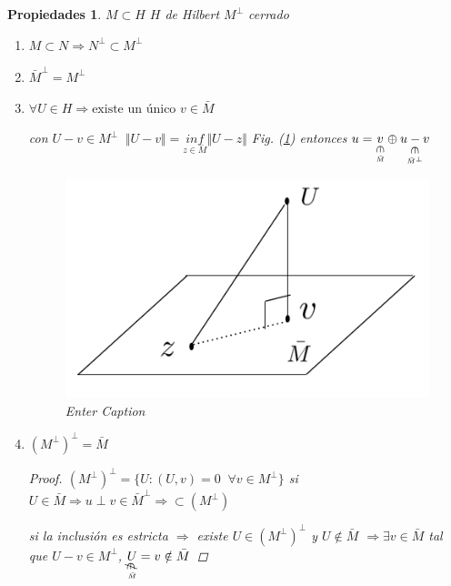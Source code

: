 \documentclass[a4paper,10pt]{book}
\newtheorem{propiedades}{Propiedades}
\newcommand{\rotin}{\mathbin{\rotatebox[origin=c]{270}{$\in$}}}
\newcommand{\rotnotin}{\mathbin{\rotatebox[origin=c]{270}{$\notin$}}}
\begin{document}
\begin{propiedades} $M\subset H$ $H$ de Hilbert  $M^\perp$ cerrado 
\begin{enumerate}
    \item $M\subset N \Rightarrow N^\perp \subset M^\perp$
    \item $\bar{M}^\perp = M^\perp$
    \item $\forall U \in H \Rightarrow \text{existe un único  } v \in \bar{M}$

    con $ U - v \in M^\perp \; \;  \Vert U-v\Vert = \underset{z\in \bar{M}}{inf} \Vert U-z\Vert$ Fig. (\ref{fig:3})
    entonces $u= \underset{\underset{\bar{M}}{\rotin}}{v} \oplus \underset{\underset{\bar{M}^\perp}{\rotin}}{u -v}$
    \begin{figure}[H]
        \centering
        \includegraphics[width=0.5\linewidth]{Screen Shot 2024-02-10 at 18.39.45.png}
        \caption{Enter Caption}
        \label{fig:3}
    \end{figure}
    \item $(M^\perp ) ^\perp = \bar{M}$

    \begin{proof}
        $(M^\perp)^\perp = \{ U : (U,v) =0 \;\; \forall v \in M^\perp\}$ 
        si $U\in \bar{M} \Rightarrow u \perp v  \in  \bar{M}^\perp \Rightarrow \subset (M^\perp) $

        si la inclusión es estricta $\Rightarrow$ existe $U\in (M^\perp)^\perp $ y $U\notin \bar{M}$  $\Rightarrow \exists v \in \bar{M} $  tal que  
        $U-v \in M^\perp $, $\underset{\underset{\bar{M}}{\rotnotin}}{U} = v\notin \bar{M}$
    \end{proof}
    
\end{enumerate}
\end{propiedades}
    
\end{document}
